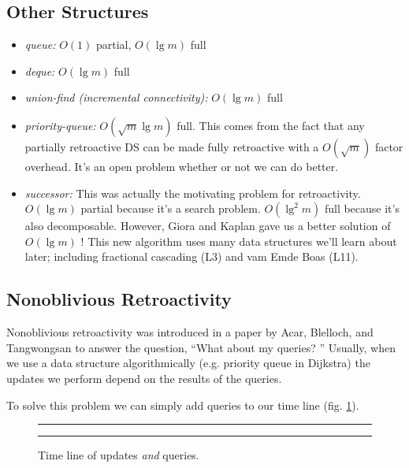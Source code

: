 \documentclass[11pt]{article}
\begin{document}
\subsection{Other Structures}
\begin{itemize}
\item{\emph{queue:}} $O(1)$ partial, $O(\lg m)$ full
\item{\emph{deque:}} $O(\lg m)$ full
\item{\emph{union-find (incremental connectivity):}} $O(\lg m)$ full
\item{\emph{priority-queue:}} $O(\sqrt{m}\lg m)$ full. This comes from the fact that any partially retroactive DS can be made fully retroactive with a $O(\sqrt{m})$ factor overhead.  It's an open problem whether or not we can do better.
\item{\emph{successor:}} This was actually the motivating problem for retroactivity.  $O(\lg m)$ partial because it's a search problem. $O(\lg^2 m)$ full because it's also decomposable.  However, Giora and Kaplan gave us a better solution of $O(\lg m)$ \cite{gk}!  This new algorithm uses many data structures we'll learn about later; including fractional cascading (L3) and vam Emde Boas (L11).

\end{itemize}

\subsection{Nonoblivious Retroactivity}

Nonoblivious retroactivity was introduced in a paper by Acar, Blelloch, and Tangwongsan to answer the question, ``What about my queries? \cite{abt}''  Usually, when we use a data structure algorithmically (e.g. priority queue in Dijkstra) the updates we perform depend on the results of the queries.

To solve this problem we can simply add queries to our time line (fig. \ref{fig-nrtl}).

\begin{figure}[ht]
	\rule{\textwidth}{0.005in}
  \begin{center}
  \end{center}

  \caption{\small Time line of updates \emph{and} queries.}
  \label{fig-nrtl}
	\rule{\textwidth}{0.005in}
\end{figure}
\end{document}
